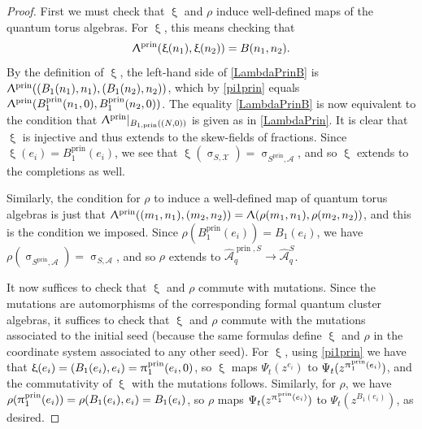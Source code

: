 \documentclass{amsart}
\DeclareMathOperator{\prin}{prin}
\let\rar=\rightarrow
\let\s=\mathcal
\let\wh=\widehat
\renewcommand{\pi}{\uppi\hspace{0.05em}}
\renewcommand{\xi}{\upxi}
\renewcommand{\sigma}{\upsigma}
\renewcommand{\Lambda}{\Uplambda}
\theoremstyle{plain}%
\theoremstyle{definition}
\theoremstyle{remark}
\begin{document}
\begin{proof}
First we must check that $\xi$ and $\rho$ induce well-defined maps of the quantum torus algebras.  For $\xi$, this means checking that 
\begin{align}\label{LambdaPrinB}
    \Lambda^{\prin}(\xi(n_1),\xi(n_2))=B(n_1,n_2).
\end{align}
By the definition of $\xi$, the left-hand side of \eqref{LambdaPrinB} is $\Lambda^{\prin}((B_1(n_1),n_1),(B_1(n_2),n_2))$, which by \eqref{pi1prin} equals $\Lambda^{\prin}(B^{\prin}_1(n_1,0),B^{\prin}_1(n_2,0))$.  The equality \eqref{LambdaPrinB} is now equivalent to the condition that $\Lambda^{\prin}|_{B_{1,\prin}((N,0))}$ is given as in \eqref{LambdaPrin}.  It is clear that $\xi$ is injective and thus extends to the skew-fields of fractions.  Since $\xi(e_i)=B_1^{\prin}(e_i)$, we see that $\xi(\sigma_{S,\s{X}})= \sigma_{S^{\prin},\s{A}}$, and so $\xi$ extends to the completions as well.

Similarly, the condition for $\rho$ to induce a well-defined map of quantum torus algebras is just that $\Lambda^{\prin}((m_1,n_1),(m_2,n_2))=\Lambda(\rho(m_1,n_1),\rho(m_2,n_2))$, and this is the condition we imposed.  Since $\rho(B_1^{\prin}(e_i))=B_1(e_i)$, we have $\rho(\sigma_{S^{\prin},\s{A}})=\sigma_{S,\s{A}}$, and so $\rho$ extends to $\wh{\s{A}}_q^{\prin,S}\rar \wh{\s{A}}_q^S$. 


It now suffices to check that $\xi$ and $\rho$ commute with mutations.  Since the mutations are automorphisms of the corresponding formal quantum cluster algebras, it suffices to check that $\xi$ and $\rho$ commute with the mutations associated to the initial seed (because the same formulas define $\xi$ and $\rho$ in the coordinate system associated to any other seed).  For $\xi$, using \eqref{pi1prin} we have that $\xi(e_i)=(B_1(e_i),e_i)=\pi^{\prin}_1(e_i,0)$, so $\xi$ maps $\Psi_t(z^{e_i})$ to $\Psi_t(z^{\pi^{\prin}_1(e_i)})$, and the commutativity of $\xi$ with the mutations follows.  Similarly, for $\rho$, we have $\rho(\pi^{\prin}_1(e_i)) = \rho(B_1(e_i),e_i) =  B_1(e_i)$, so $\rho$ maps $\Psi_t(z^{\pi^{\prin}_1(e_i)})$ to $\Psi_t(z^{B_1(e_i)})$, as desired. 
\end{proof}
\end{document}
